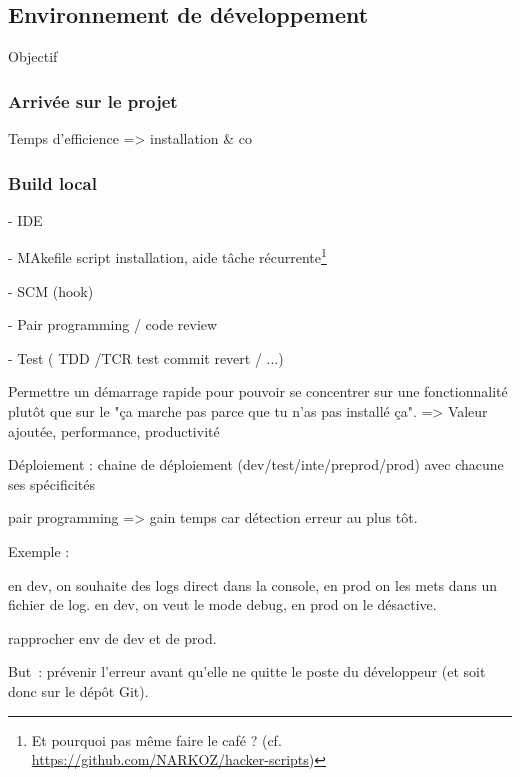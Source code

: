 
\subsection{Environnement de développement}

Objectif

\subsubsection{Arrivée sur le projet}

Temps d'efficience => installation \& co

\subsubsection{Build local}

- IDE

- MAkefile script installation, aide tâche récurrente\footnote{Et pourquoi pas même faire le café ? (cf. \url{https://github.com/NARKOZ/hacker-scripts})}

- SCM (hook)

- Pair programming / code review

- Test ( TDD /TCR test commit revert / ...)


Permettre un démarrage rapide pour pouvoir se concentrer sur une fonctionnalité plutôt que sur le "ça marche pas parce que tu n’as pas installé ça". => Valeur ajoutée, performance, productivité

Déploiement : chaine de déploiement (dev/test/inte/preprod/prod) avec chacune ses spécificités

pair programming => gain temps car détection erreur au plus tôt.

Exemple :

en dev, on souhaite des logs direct dans la console, en prod on les mets dans un fichier de log.
en dev, on veut le mode debug, en prod on le désactive.

rapprocher env de dev et de prod.

But : prévenir l'erreur avant qu'elle ne quitte le poste du développeur (et soit donc sur le dépôt Git).


